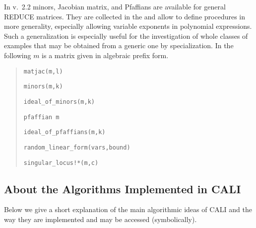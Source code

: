 In v.\ 2.2 minors, Jacobian matrix, and Pfaffians are available for
general REDUCE matrices. They are collected in the  and allow to define procedures in more generality, especially
allowing variable exponents in polynomial expressions. Such a
generalization is especially useful for the investigation of whole
classes of examples that may be obtained from a generic one by
specialization. In the following $m$ is a matrix given in algebraic
prefix form. 
\begin{quote}
\verb|matjac(m,l)| 


\verb|minors(m,k)| 


\verb|ideal_of_minors(m,k)| 


\verb|pfaffian m| 


\verb|ideal_of_pfaffians(m,k)| 


\verb|random_linear_form(vars,bound)| 


\verb|singular_locus!*(m,c)| 

\end{quote}

\subsection{About the Algorithms Implemented in CALI}

Below we give a short explanation of the main algorithmic ideas of
CALI and the way they are implemented and may be accessed
(symbolically). 

